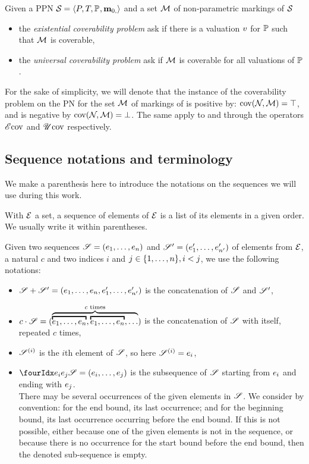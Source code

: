 \begin{defi}
  Given a \ac{PPN} $\mathcal{S}_{} = \left\langle P_{}, T_{}, \mathbb{P}_{}, \mathbf{m}_{0,}\right\rangle$ and a set $\mathcal{M}$ of non-parametric markings of $\mathcal{S}_{}$
  \begin{itemize}
    \item the \emph{existential coverability problem} ask if there is a valuation $\val$ for $\mathbb{P}$ such that $\mathcal{M}$ is coverable,
    \item the \emph{universal   coverability problem} ask if $\mathcal{M}$ is coverable for all valuations of $\mathbb{P}$.
  \end{itemize}
\end{defi}

For the sake of simplicity, we will denote that the instance of the coverability problem on the \ac{PN} \namePN for the set $\mathcal{M}$ of markings of \namePN is positive by: $\operatorname{cov}(\mathcal{N}_{}, \mathcal{M}) = \top$, and is negative by $\operatorname{cov}(\mathcal{N}_{}, \mathcal{M}) = \bot$. The same apply to \Ecov and \Ucov through the operators $\operatorname{\mathscr{E}cov}$ and $\operatorname{\mathscr{U}cov}$ respectively.

\subsection{Sequence notations and terminology}

We make a parenthesis here to introduce the notations on the sequences we will use during this work.

With $\mathcal{E}$ a set, a sequence of elements of $\mathcal{E}$ is a list of its elements in a given order.
We usually write it within parentheses.

Given two sequences $\defSeq{1}{n}$ and $\defSeq[\seq'][\sit']{1}{n'}$ of elements from $\mathcal{E}$, a natural $c$ and two indices $i$ and $j \in \{1, \dots, n\}, i < j$, we use the following notations:
\begin{itemize}
  \item $\seq \concat \seq' = (\elemsSeq{1}{n}, \elemsSeq[\sit']{1}{n'})$ is the concatenation of $\seq$ and $\seq'$,
  \item $c \cdot \seq = (\overbrace{\overbracket{\elemsSeq{1}{n}}, \overbracket{\elemsSeq{1}{n}}, {\dots}}^{c \text{ times}})$ is the concatenation of $\seq$ with itself, repeated $c$ times,
  \item $\seq[i]$ is the $i$th element of $\seq$, so here $\seq[i] = \sit_i$, 
  \item $\slice{\sit_i}{\sit_j} = \bodySeq{i}{j}$ is the subsequence of $\seq$ starting from $e_i$ and ending with $e_j$.\\
    There may be several occurrences of the given elements in $\seq$.
    We consider by convention: for the end bound, its last occurrence; and for the beginning bound, its last occurrence occurring before the end bound.
    If this is not possible, either because one of the given elements is not in the sequence, or because there is no occurrence for the start bound before the end bound, then the denoted sub-sequence is empty.
\end{itemize}



